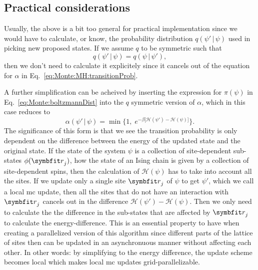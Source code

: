 \subsection{Practical considerations}

Usually, the above is a bit too general for practical implementation since we would have to calculate, or know, the probability
distribution $q(\psi'\,|\,\psi)$ used in picking new proposed states. If we assume $q$ to be symmetric such that
\begin{equation}
    \label{eq:Monte:MH:pickDistributionSymmetry}
    q(\psi'\,|\,\psi) = q(\psi\,|\,\psi'),
\end{equation}
then we don't need to calculate it explicitely since it cancels out of the equation for $\alpha$ in Eq.~\eqref{eq:Monte:MH:transitionProb}.

A further simplification can be acheived by inserting the expression for $\pi(\psi)$ in Eq.~\eqref{eq:Monte:boltzmannDist} into the $q$
symmetric version of $\alpha$, which in this case reduces to
\begin{equation}
    \label{eq:Monte:MH:reducedTransitionProb}
    \alpha(\psi'\,|\,\psi) = \min\Big\{1,\;e^{-\beta\big[\mathcal{H}(\psi') - \mathcal{H}(\psi)\big]}\Big\}.
\end{equation}
The significance of this form is that we see the transition probability is only dependent on the difference between the energy of the
updated state and the original state. If the state of the system $\psi$ is a collection of site-dependent sub-states $\phi(\v{r}_j)$,
\eg how the state of an Ising chain is given by a collection of site-dependent spins, then the calculation of $\mathcal{H}(\psi)$
has to take into account all the sites. If we update only a single site $\v{r}_j$ of $\psi$ to get $\psi'$, which we call a local
\ac{mc} update, then all the sites that do not have an interaction with $\v{r}_j$ cancels out in the
difference $\mathcal{H}(\psi')-\mathcal{H}(\psi)$. Then we only need to calculate the the difference in the sub-states that are
affected by $\v{r}_j$ to calculate the energy-difference. This is an essential property to have when creating a parallelized version
of this algorithm since different parts of the lattice of sites then can be updated in an asynchronuous manner without affecting
each other. In other words: by simplifying to the energy difference, the update scheme becomes local which makes local \ac{mc}
updates grid-parallelizable.

